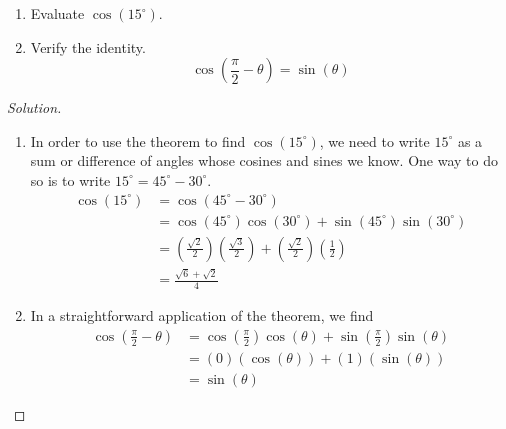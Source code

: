 \documentclass{ximera}
\begin{document}
\begin{example}
  \label{cosinesumdiffex}
  \begin{enumerate}
    \item Evaluate \( \cos\left(15^{\circ}\right) \).
    \item  Verify the identity.
    \[
      \cos\left(\frac{\pi}{2} - \theta\right) = \sin(\theta)
    \]
  \end{enumerate}
  
  \begin{proof}[Solution]
    \begin{enumerate}
      \item In order to use the theorem to find \( \cos(15^{\circ}) \), we need to write \( 15^{\circ} \) as a sum or difference of angles whose cosines and sines we know.
      One way to do so is to write \( 15^{\circ} = 45^{\circ} - 30^{\circ} \).
      \vspace{-.1in}
      \begin{align*}
        \cos(15^{\circ}) &= \cos(45^{\circ} - 30^{\circ}) \\[2pt]
        &= \cos(45^{\circ})\cos(30^{\circ}) + \sin(45^{\circ})\sin(30^{\circ}) \\[2pt]
        &= \left(\frac{\sqrt{2}}{2}\right)\left(\frac{\sqrt{3}}{2}\right) + \left( \frac{\sqrt{2}}{2} \right)\left( \frac{1}{2} \right)\\[15pt]
        &= \frac{\sqrt{6}+ \sqrt{2}}{4}
      \end{align*}

      \item  In a straightforward application of the theorem, we find
      \begin{align*}
        \cos\left(\frac{\pi}{2} - \theta\right) &= \cos\left(\frac{\pi}{2}\right)\cos(\theta) + \sin(\frac{\pi}{2})\sin(\theta ) \\[10pt]
        &= (0)(\cos(\theta)) + (1)(\sin(\theta)) \\[4pt]
        &= \sin(\theta)
      \end{align*}
    \end{enumerate}
    \vspace{-\baselineskip}
  \end{proof}
\end{example}
\end{document}
